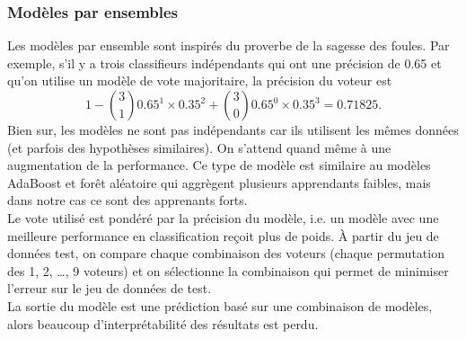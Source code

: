 \subsubsection{Modèles par ensembles}

Les modèles par ensemble sont inspirés du proverbe de la sagesse des foules. Par exemple, s'il y a trois classifieurs indépendants qui ont une précision de 0.65 et qu'on utilise un modèle de vote majoritaire, la précision du voteur est 
$$1 - \binom{3}{1}0.65^1\times 0.35^2 + \binom{3}{0}0.65^0\times 0.35^3 = 0.71825.$$
Bien sur, les modèles ne sont pas indépendants car ils utilisent les mêmes données (et parfois des hypothèses similaires). On s'attend quand même à une augmentation de la performance. Ce type de modèle est similaire au modèles AdaBoost et forêt aléatoire qui aggrègent plusieurs apprendants faibles, mais dans notre cas ce sont des apprenants forts.\\

Le vote utilisé est pondéré par la précision du modèle, i.e. un modèle avec une meilleure performance en classification reçoit plus de poids. À partir du jeu de données test, on compare chaque combinaison des voteurs (chaque permutation des 1, 2, \dots, 9 voteurs) et on sélectionne la combinaison qui permet de minimiser l'erreur sur le jeu de données de test.\\

La sortie du modèle est une prédiction basé sur une combinaison de modèles, alors beaucoup d'interprétabilité des résultats est perdu.
